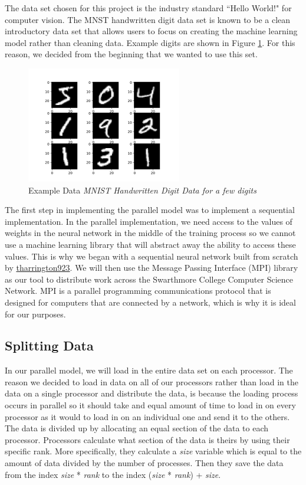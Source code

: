 \documentclass[11pt,twocolumn]{article}
\begin{document}
The data set chosen for this project is the industry standard ``Hello World!" for computer vision. The MNST handwritten digit data set is known to be a clean introductory data set that allows users to focus on creating the machine learning model rather than cleaning data. Example digits are shown in Figure \ref{MNIST}. For this reason, we decided from the beginning that we wanted to use this set.

\begin{figure}[t]
    \centerline{
        \includegraphics[height=2in]{MNIST.png}
    }
    \caption{\label{MNIST}Example Data {\em MNIST Handwritten Digit Data for a few digits}}
\end{figure}

The first step in implementing the parallel model was to implement a sequential implementation. In the parallel implementation, we need access to the values of weights in the neural network in the middle of the training process so we cannot use a machine learning library that will abstract away the ability to access these values. This is why we began with a sequential neural network built from scratch by \href{https://github.com/tharrington923/neuralnet_handwritten_digit_recognition}{tharrington923}. We will then use the Message Passing Interface (MPI) library as our tool to distribute work across the Swarthmore College Computer Science Network. MPI is a parallel programming communications protocol that is designed for computers that are connected by a network, which is why it is ideal for our purposes.  

\subsection{Splitting Data}
In our parallel model, we will load in the entire data set on each processor. The reason we decided to load in data on all of our processors rather than load in the data on a single processor and distribute the data, is because the loading process occurs in parallel so it should take and equal amount of time to load in on every processor as it would to load in on an individual one and send it to the others. The data is divided up by allocating an equal section of the data to each processor. Processors calculate what section of the data is theirs by using their specific rank. More specifically, they calculate a \emph{size} variable which is equal to the amount of data divided by the number of processes. Then they save the data from the index \emph{size} * \emph{rank} to the index (\emph{size} * \emph{rank}) + \emph{size}.
\end{document}
